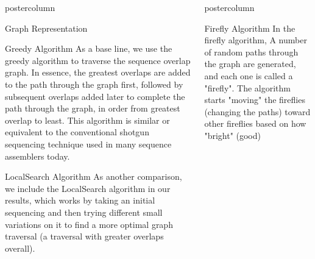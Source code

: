 \documentclass[final,hyperref={pdfpagelabels=false}]{beamer}
\newlength{\columnheight}
\begin{document}
\begin{frame}
\begin{columns}
\begin{column}{.32\textwidth}
\begin{beamercolorbox}[center,wd=\textwidth]{postercolumn}
\begin{minipage}[T]{.95\textwidth}
{\begin{block}{Graph Representation}
\begin{center}
                            \end{center}
                       \end{block}
                        \begin{block}{Greedy Algorithm}
                            As a base line, we use the greedy algorithm to
                            traverse the sequence overlap graph.  In essence,
                            the greatest overlaps are added to the path through
                            the graph first, followed by subsequent overlaps
                            added later to complete the path through the graph,
                            in order from greatest overlap to least.  This
                            algorithm is similar or equivalent to the
                            conventional shotgun sequencing technique used in
                            many sequence assemblers today.
                        \end{block}
                        \begin{block}{LocalSearch Algorithm}
                            As another comparison, we include the LocalSearch
                            algorithm in our results, which works by taking an
                            initial sequencing and then trying different small
                            variations on it to find a more optimal graph
                            traversal (a traversal with greater overlaps
                            overall).
                        \end{block}
                } \end{minipage}
            \end{beamercolorbox}
        \end{column}
        \begin{column}{.32\textwidth}
            \begin{beamercolorbox}[center,wd=\textwidth]{postercolumn}
                \begin{minipage}[T]{.95\textwidth}
                    \parbox[t][\columnheight]{\textwidth}{
                        \begin{block}{Firefly Algorithm}
                            In the firefly algorithm, A number of
                            random paths through the graph are generated, and
                            each one is called a "firefly". The algorithm
                            starts "moving" the fireflies (changing the paths)
                            toward other fireflies based on how "bright" (good)

\end{block}}
\end{minipage}
\end{beamercolorbox}
\end{column}
\end{columns}
\end{frame}
\end{document}
